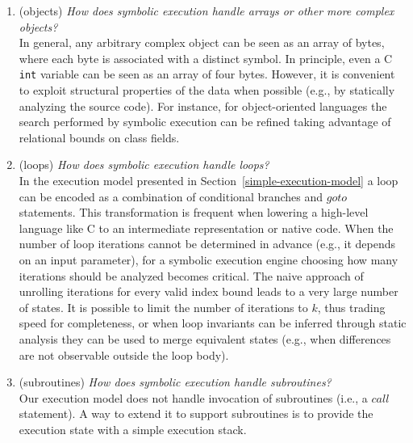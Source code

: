 \begin{enumerate}

  \item (objects) {\em How does symbolic execution handle arrays or other more complex objects?} \\
  In general, any arbitrary complex object can be seen as an array of bytes, where each byte is associated with a distinct symbol. In principle, even a C {\tt int} variable can be seen as an array of four bytes. However, it is convenient to exploit structural properties of the data when possible (e.g., by statically analyzing the source code). For instance, for object-oriented languages the search performed by symbolic execution can be refined taking advantage of relational bounds on class fields.

  \item (loops) {\em How does symbolic execution handle loops?} \\
  In the execution model presented in Section~\ref{simple-execution-model} a loop can be encoded as a combination of conditional branches and $goto$ statements. This transformation is frequent when lowering a high-level language like C to an intermediate representation or native code. When the number of loop iterations cannot be determined in advance (e.g., it depends on an input parameter), for a symbolic execution engine choosing how many iterations should be analyzed becomes critical. The naive approach of unrolling iterations for every valid index bound leads to a very large number of states. It is possible to limit the number of iterations to $k$, thus trading speed for completeness, or when loop invariants can be inferred through static analysis they can be used to merge equivalent states (e.g., when differences are not observable outside the loop body).

  \item (subroutines) {\em How does symbolic execution handle subroutines?} \\
  Our execution model does not handle invocation of subroutines (i.e., a $call$ statement).  A way to extend it to support subroutines is to provide the execution state with a simple execution stack.


\end{enumerate}
